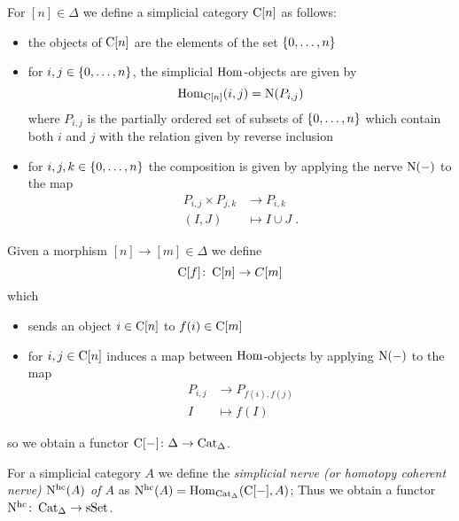 \begin{construction}%
    For $[n]\in\Delta$ we define a simplicial category $\operatorname{C}[n]$ as follows:
    \begin{itemize}
        \item the objects of $\operatorname{C}[n]$ are the elements of the set $\left\lbrace0,\ldots,n\right\rbrace$
        \item for $i,j\in\left\lbrace0,\ldots,n\right\rbrace$, the simplicial $\operatorname{Hom}$-objects are given by 
            \begin{equation*}
                \operatorname{Hom}_{\operatorname{C}[n]}(i,j)=\operatorname{N}(P_{i,j})
            \end{equation*}
            where $P_{i,j}$ is the partially ordered set of subsets of $\left\lbrace0,\ldots,n\right\rbrace$ which contain both $i$ and $j$ with the relation given by reverse inclusion
        \item for $i,j,k\in\left\lbrace0,\ldots,n\right\rbrace$ the composition is given by applying the nerve $\operatorname{N}(-)$ to the map
        \begin{align*}
                P_{i,j}\times P_{j,k}&\to P_{i,k}\\
                (I,J)&\mapsto I\cup J\;.
        \end{align*}
    \end{itemize}
    Given a morphism $[n]\to[m]\in\Delta$ we define
    \begin{equation*}
        \operatorname{C}[f]\colon\operatorname{C}[n]\to C[m]
    \end{equation*}
    which
    \begin{itemize}
        \item sends an object $i\in\operatorname{C}[n]$ to $f(i)\in\operatorname{C}[m]$
        \item for $i,j\in\operatorname{C}[n]$ induces a map between $\operatorname{Hom}$-objects by applying $\operatorname{N}(-)$ to the map
            \begin{align*}
                P_{i,j}&\to P_{f(i),f(j)}\\
                I&\mapsto f(I)
            \end{align*}
    \end{itemize}
    so we obtain a functor $\operatorname{C}[-]\colon\Delta\to\operatorname{Cat}_{\Delta}$.
\end{construction}
\begin{definition}
    For a simplicial category $A$ we define the \emph{simplicial nerve (or homotopy coherent nerve) $\operatorname{N^{hc}}(A)$ of $A$} as $\operatorname{N^{hc}}(A)=\operatorname{Hom}_{\operatorname{Cat}_{\Delta}}(\operatorname{C}[-],A)$; 
    Thus we obtain a functor $\operatorname{N^{hc}}\colon\operatorname{Cat}_{\Delta}\to\operatorname{sSet}$.
\end{definition}
